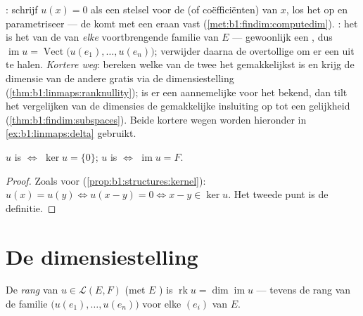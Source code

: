 \begin{method}
\label{met:b1:linmaps:kerim}
\emph{}: schrijf $u(x) = 0$ als een stelsel voor de
 (of coëfficiënten) van $x$, los het op en
parametriseer --- de  komt met een  eraan vast
(\cref{met:b1:findim:computedim}). \emph{}: het is het
 van de  van \emph{elke} voortbrengende familie
van $E$ --- gewoonlijk een , dus $\operatorname{im} u =
\operatorname{Vect}\bigl(u(e_1), \dots, u(e_n)\bigr)$; verwijder
daarna de overtollige  om er een  uit te halen.
\emph{Kortere weg}: bereken welke van de twee het gemakkelijkst
is en krijg de dimensie van de andere gratis via de
dimensiestelling (\cref{thm:b1:linmaps:ranknullity}); is er een
aannemelijke  voor het  bekend, dan tilt
het vergelijken van de dimensies de gemakkelijke insluiting op tot
een gelijkheid (\cref{thm:b1:findim:subspaces}). Beide kortere
wegen worden hieronder in \cref{ex:b1:linmaps:delta} gebruikt.
\end{method}

\begin{proposition}\label{prop:b1:linmaps:kernel}
$u$ is  $\iff$ $\ker u = \{0\}$; $u$ is  $\iff$
$\operatorname{im} u = F$.
\end{proposition}

\begin{proof}
Zoals voor  (\cref{prop:b1:structures:kernel}): $u(x) = u(y)
\iff u(x - y) = 0 \iff x - y \in \ker u$. Het tweede punt is de
definitie.
\end{proof}

\section{De dimensiestelling}

\begin{definition}\label{def:b1:linmaps:rank}
De \emph{rang} van $u \in
\mathcal{L}(E, F)$ (met $E$ ) is
$\operatorname{rk} u = \dim \operatorname{im} u$ --- tevens de rang
van de familie $\bigl(u(e_1), \dots, u(e_n)\bigr)$ voor elke 
$(e_i)$ van $E$.
\end{definition}

